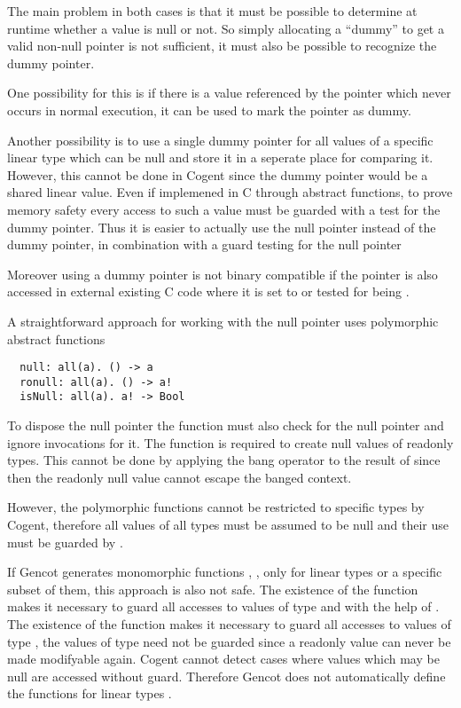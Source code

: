 The main problem in both cases is that it must be possible to determine at runtime whether a value is null or not. So simply
allocating a ``dummy'' to get a valid non-null pointer is not sufficient, it must also be possible to recognize the dummy pointer.

One possibility for this is if there is a value referenced by the pointer which never occurs in normal execution,
it can be used to mark the pointer as dummy. 

Another possibility is to use a single dummy pointer for all values of a specific linear type which can be null and store it 
in a seperate place for comparing it. However, this cannot be done in Cogent since the dummy pointer would be a shared linear 
value. Even if implemened in C through abstract functions, to prove memory safety every access to such a value must 
be guarded with a test for the dummy pointer. Thus it is easier to actually use the null pointer instead of the dummy pointer,
in combination with a guard testing for the null pointer

Moreover using a dummy pointer is not binary compatible if the pointer is 
also accessed in external existing C code where it is set to  or tested for being .

A straightforward approach for working with the null pointer uses polymorphic abstract functions
\begin{verbatim}
  null: all(a). () -> a
  ronull: all(a). () -> a!
  isNull: all(a). a! -> Bool
\end{verbatim}
To dispose the null pointer the function  must also check for the null pointer and ignore
invocations for it. The function  is required to create null values of readonly types. This cannot be done 
by applying the bang operator to the result of  since then the readonly null value
cannot escape the banged context. 

However, the polymorphic functions cannot be restricted to specific types  by Cogent, therefore all values of all
types must be assumed to be null and their use must be guarded by .

If Gencot generates monomorphic functions , ,  only for linear types or a
specific subset of them, this approach is also not safe. The existence of the function  makes it necessary to guard all accesses to values of type
 and  with the help of . The existence of the function  makes it necessary to guard
all accesses to values of type , the values of type  need not be guarded since a readonly value can never be 
made modifyable again. Cogent cannot detect cases where values which may be null are accessed without guard.
Therefore Gencot does not automatically define the functions for linear types .

